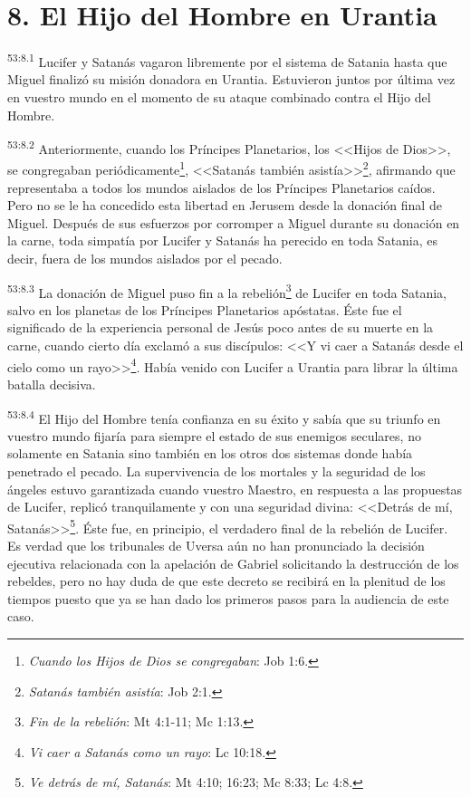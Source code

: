 \section*{8. El Hijo del Hombre en Urantia}
\par
\textsuperscript{53:8.1} Lucifer y Satanás vagaron libremente por el sistema de Satania hasta que Miguel finalizó su misión donadora en Urantia. Estuvieron juntos por última vez en vuestro mundo en el momento de su ataque combinado contra el Hijo del Hombre.

\par
\textsuperscript{53:8.2} Anteriormente, cuando los Príncipes Planetarios, los <<Hijos de Dios>>, se congregaban periódicamente\footnote{\textit{Cuando los Hijos de Dios se congregaban}: Job 1:6.}, <<Satanás también asistía>>\footnote{\textit{Satanás también asistía}: Job 2:1.}, afirmando que representaba a todos los mundos aislados de los Príncipes Planetarios caídos. Pero no se le ha concedido esta libertad en Jerusem desde la donación final de Miguel. Después de sus esfuerzos por corromper a Miguel durante su donación en la carne, toda simpatía por Lucifer y Satanás ha perecido en toda Satania, es decir, fuera de los mundos aislados por el pecado.

\par
\textsuperscript{53:8.3} La donación de Miguel puso fin a la rebelión\footnote{\textit{Fin de la rebelión}: Mt 4:1-11; Mc 1:13.} de Lucifer en toda Satania, salvo en los planetas de los Príncipes Planetarios apóstatas. Éste fue el significado de la experiencia personal de Jesús poco antes de su muerte en la carne, cuando cierto día exclamó a sus discípulos: <<Y vi caer a Satanás desde el cielo como un rayo>>\footnote{\textit{Vi caer a Satanás como un rayo}: Lc 10:18.}. Había venido con Lucifer a Urantia para librar la última batalla decisiva.

\par
\textsuperscript{53:8.4} El Hijo del Hombre tenía confianza en su éxito y sabía que su triunfo en vuestro mundo fijaría para siempre el estado de sus enemigos seculares, no solamente en Satania sino también en los otros dos sistemas donde había penetrado el pecado. La supervivencia de los mortales y la seguridad de los ángeles estuvo garantizada cuando vuestro Maestro, en respuesta a las propuestas de Lucifer, replicó tranquilamente y con una seguridad divina: <<Detrás de mí, Satanás>>\footnote{\textit{Ve detrás de mí, Satanás}: Mt 4:10; 16:23; Mc 8:33; Lc 4:8.}. Éste fue, en principio, el verdadero final de la rebelión de Lucifer. Es verdad que los tribunales de Uversa aún no han pronunciado la decisión ejecutiva relacionada con la apelación de Gabriel solicitando la destrucción de los rebeldes, pero no hay duda de que este decreto se recibirá en la plenitud de los tiempos puesto que ya se han dado los primeros pasos para la audiencia de este caso.

